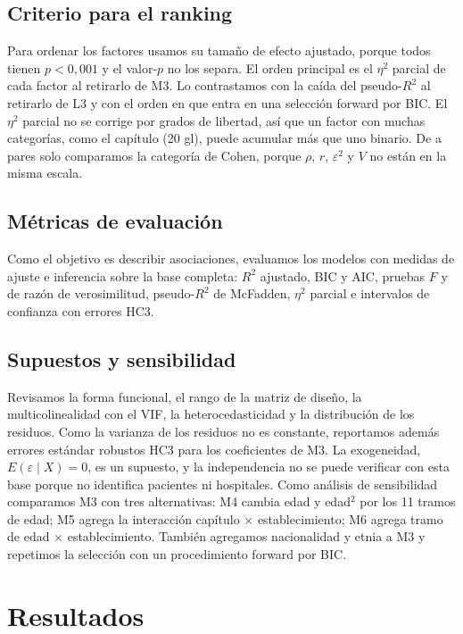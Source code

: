 \documentclass[10.5pt,a4paper,headings=small,abstract=false,bibliography=totoc,listof=totoc]{scrartcl}
\begin{document}
\subsection{Criterio para el ranking}

Para ordenar los factores usamos su tamaño de efecto ajustado, porque todos tienen $p<0{,}001$ y el valor-$p$ no los separa. El orden principal es el $\eta^2$ parcial de cada factor al retirarlo de M3. Lo contrastamos con la caída del pseudo-$R^2$ al retirarlo de L3 y con el orden en que entra en una selección forward por BIC. El $\eta^2$ parcial no se corrige por grados de libertad, así que un factor con muchas categorías, como el capítulo (20 gl), puede acumular más que uno binario. De a pares solo comparamos la categoría de Cohen, porque $\rho$, $r$, $\varepsilon^2$ y $V$ no están en la misma escala.

\subsection{Métricas de evaluación}

Como el objetivo es describir asociaciones, evaluamos los modelos con medidas de ajuste e inferencia sobre la base completa: $R^2$ ajustado, BIC y AIC, pruebas $F$ y de razón de verosimilitud, pseudo-$R^2$ de McFadden, $\eta^2$ parcial e intervalos de confianza con errores HC3.

\subsection{Supuestos y sensibilidad}

Revisamos la forma funcional, el rango de la matriz de diseño, la multicolinealidad con el VIF, la heterocedasticidad y la distribución de los residuos. Como la varianza de los residuos no es constante, reportamos además errores estándar robustos HC3 \citep{long2000} para los coeficientes de M3. La exogeneidad, $E(\varepsilon\mid X)=0$, es un supuesto, y la independencia no se puede verificar con esta base porque no identifica pacientes ni hospitales. Como análisis de sensibilidad comparamos M3 con tres alternativas: M4 cambia edad y edad$^2$ por los 11 tramos de edad; M5 agrega la interacción capítulo $\times$ establecimiento; M6 agrega tramo de edad $\times$ establecimiento. También agregamos nacionalidad y etnia a M3 y repetimos la selección con un procedimiento forward por BIC.

\section{Resultados}
\end{document}
